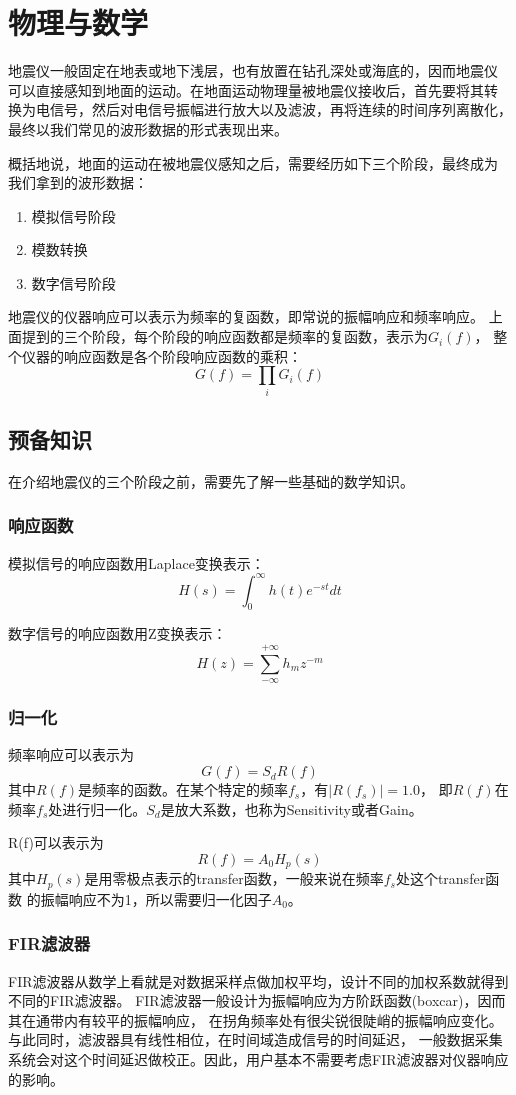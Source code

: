 \section{物理与数学}
地震仪一般固定在地表或地下浅层，也有放置在钻孔深处或海底的，因而地震仪
可以直接感知到地面的运动。在地面运动物理量被地震仪接收后，首先要将其转
换为电信号，然后对电信号振幅进行放大以及滤波，再将连续的时间序列离散化，
最终以我们常见的波形数据的形式表现出来。

概括地说，地面的运动在被地震仪感知之后，需要经历如下三个阶段，最终成为
我们拿到的波形数据：
\begin{enumerate}
\item 模拟信号阶段
\item 模数转换
\item 数字信号阶段
\end{enumerate}

地震仪的仪器响应可以表示为频率的复函数，即常说的振幅响应和频率响应。
上面提到的三个阶段，每个阶段的响应函数都是频率的复函数，表示为$G_i(f)$，
整个仪器的响应函数是各个阶段响应函数的乘积：
\[
    G(f)=\prod_i G_i(f)
\]

\subsection{预备知识}
在介绍地震仪的三个阶段之前，需要先了解一些基础的数学知识。
\subsubsection{响应函数}
模拟信号的响应函数用Laplace变换表示：
\[
    H(s)=\int_0^{\infty}h(t)e^{-st}dt
\]

数字信号的响应函数用Z变换表示：
\[
    H(z)=\sum_{-\infty}^{+\infty}h_m z^{-m}
\]

\subsubsection{归一化}
频率响应可以表示为
\[
    G(f)=S_d R(f)
\]
其中$R(f)$是频率的函数。在某个特定的频率$f_s$，有$|R(f_s)|=1.0$，
即$R(f)$在频率$f_s$处进行归一化。$S_d$是放大系数，也称为Sensitivity或者Gain。

R(f)可以表示为
\[
    R(f)= A_0 H_p(s)
\]
其中$H_p(s)$是用零极点表示的transfer函数，一般来说在频率$f_s$处这个transfer函数
的振幅响应不为1，所以需要归一化因子$A_0$。

\subsubsection{FIR滤波器}
FIR滤波器从数学上看就是对数据采样点做加权平均，设计不同的加权系数就得到不同的FIR滤波器。
FIR滤波器一般设计为振幅响应为方阶跃函数(boxcar)，因而其在通带内有较平的振幅响应，
在拐角频率处有很尖锐很陡峭的振幅响应变化。与此同时，滤波器具有线性相位，在时间域造成信号的时间延迟，
一般数据采集系统会对这个时间延迟做校正。因此，用户基本不需要考虑FIR滤波器对仪器响应的影响。

